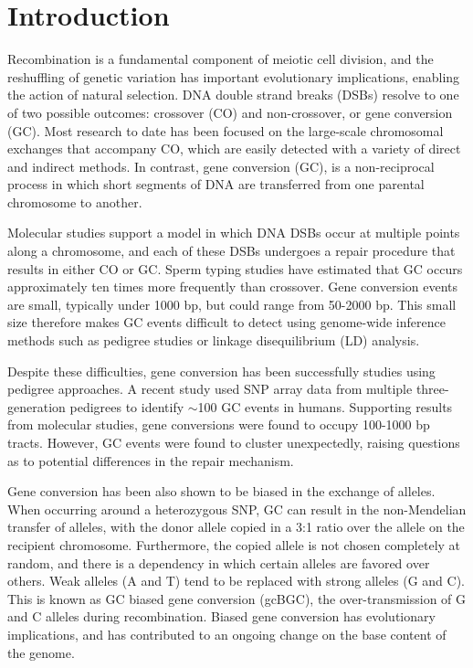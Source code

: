 
\section{Introduction}

Recombination is a fundamental component of meiotic cell division, and the reshuffling of genetic variation has important evolutionary implications, enabling the action of natural selection.
DNA double strand breaks (DSBs) resolve to one of two possible outcomes: crossover (CO) and non-crossover, or gene conversion (GC).
Most research to date has been focused on the large-scale chromosomal exchanges that accompany CO, which are easily detected with a variety of direct and indirect methods.
In contrast, gene conversion (GC), is a non-reciprocal process in which short segments of DNA are transferred from one parental chromosome to another.

Molecular studies support a model in which DNA DSBs occur at multiple points along a chromosome, and each of these DSBs undergoes a repair procedure that results in either CO or GC\cite{Baudat2007}.
Sperm typing studies have estimated that GC occurs approximately ten times more frequently than crossover\cite{Jeffreys2004,Baudat2007,Cole2012}.
Gene conversion events are small, typically under 1000 bp, but could range from 50-2000 bp\cite{Jeffreys2004}.
This small size therefore makes GC events difficult to detect using genome-wide inference methods such as pedigree studies or linkage disequilibrium (LD) analysis.

Despite these difficulties, gene conversion has been successfully studies using pedigree approaches.
A recent study used SNP array data from multiple three-generation pedigrees to identify $\sim$100 GC events in humans\cite{Williams2015}. 
Supporting results from molecular studies, gene conversions were found to occupy 100-1000 bp tracts.
However, GC events were found to cluster unexpectedly, raising questions as to potential differences in the repair mechanism.

Gene conversion has been also shown to be biased in the exchange of alleles\cite{Chen2007}.
When occurring around a heterozygous SNP, GC can result in the non-Mendelian transfer of alleles, with the donor allele copied in a 3:1 ratio over the allele on the recipient chromosome.
Furthermore, the copied allele is not chosen completely at random, and there is a dependency in which certain alleles are favored over others.
Weak alleles (A and T) tend to be replaced with strong alleles (G and C). %
This is known as GC biased gene conversion (gcBGC), the over-transmission of G and C alleles during recombination.
Biased gene conversion has evolutionary implications, and has contributed to an ongoing change on the base content of the genome\cite{Bherer2014}.

